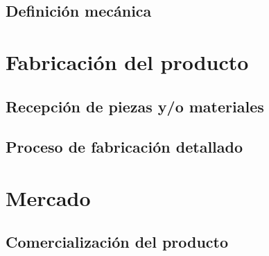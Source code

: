 	\subsection {Definición mecánica}

\section {Fabricación del producto}

	\subsection {Recepción de piezas y/o materiales}

	\subsection {Proceso de fabricación detallado}

\section {Mercado}

	\subsection {Comercialización del producto}

